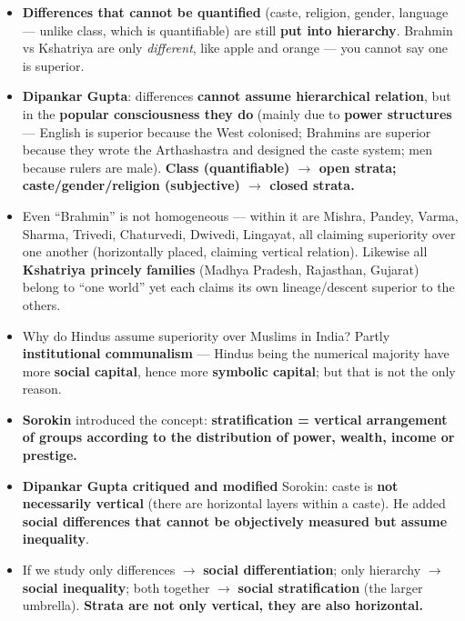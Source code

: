 \begin{KeyConcept}
\begin{itemize}
    \item \textbf{Differences that cannot be quantified} (caste, religion, gender, language --- unlike class, which is quantifiable) are still \textbf{put into hierarchy}. Brahmin vs Kshatriya are only \textit{different}, like apple and orange --- you cannot say one is superior.
    \item \textbf{Dipankar Gupta}: differences \textbf{cannot assume hierarchical relation}, but in the \textbf{popular consciousness they do} (mainly due to \textbf{power structures} --- English is superior because the West colonised; Brahmins are superior because they wrote the Arthashastra and designed the caste system; men because rulers are male). \textbf{Class (quantifiable) $\rightarrow$ open strata; caste/gender/religion (subjective) $\rightarrow$ closed strata.}
    \item Even ``Brahmin'' is not homogeneous --- within it are Mishra, Pandey, Varma, Sharma, Trivedi, Chaturvedi, Dwivedi, Lingayat, all claiming superiority over one another (horizontally placed, claiming vertical relation). Likewise all \textbf{Kshatriya princely families} (Madhya Pradesh, Rajasthan, Gujarat) belong to ``one world'' yet each claims its own lineage/descent superior to the others.
    \item Why do Hindus assume superiority over Muslims in India? Partly \textbf{institutional communalism} --- Hindus being the numerical majority have more \textbf{social capital}, hence more \textbf{symbolic capital}; but that is not the only reason.
\end{itemize}
\end{KeyConcept}

\begin{KeyConcept}
\begin{itemize}
    \item \textbf{Sorokin} introduced the concept: \textbf{stratification = vertical arrangement of groups according to the distribution of power, wealth, income or prestige.}
    \item \textbf{Dipankar Gupta critiqued and modified} Sorokin: caste is \textbf{not necessarily vertical} (there are horizontal layers within a caste). He added \textbf{social differences that cannot be objectively measured but assume inequality}.
    \item If we study only differences $\rightarrow$ \textbf{social differentiation}; only hierarchy $\rightarrow$ \textbf{social inequality}; both together $\rightarrow$ \textbf{social stratification} (the larger umbrella). \textbf{Strata are not only vertical, they are also horizontal.}
\end{itemize}
\end{KeyConcept}

